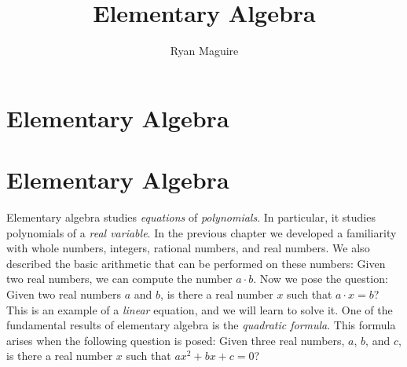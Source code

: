 \documentclass[crop=false,class=book,oneside]{standalone}                      %
\begin{document}
    \ifx\ifmain\undefined
        \title{Elementary Algebra}
        \author{Ryan Maguire}
        \date{\vspace{-5ex}}
        \maketitle
        \tableofcontents
        \setcounter{chapter}{1}
        \chapter{Elementary Algebra}
    \else
        \chapter{Elementary Algebra}
    \fi
    Elementary algebra studies \textit{equations} of \textit{polynomials}.
    In particular, it studies polynomials of a \textit{real variable}. In
    the previous chapter we developed a familiarity with whole numbers,
    integers, rational numbers, and real numbers. We also described the
    basic arithmetic that can be performed on these numbers: Given two
    real numbers, we can compute the number $a\cdot{b}$. Now we pose the
    question: Given two real numbers $a$ and $b$, is there a real number
    $x$ such that $a\cdot{x}=b$? This is an example of a \textit{linear}
    equation, and we will learn to solve it. One of the fundamental results
    of elementary algebra is the \textit{quadratic formula}. This formula
    arises when the following question is posed: Given three real numbers,
    $a$, $b$, and $c$, is there a real number $x$ such that $ax^{2}+bx+c=0$?
\end{document}
